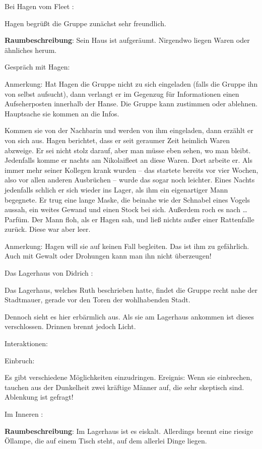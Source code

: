 Bei Hagen vom Fleet
:

Hagen begrüßt die Gruppe zunächst sehr freundlich.

\textbf{Raumbeschreibung}: Sein Haus ist aufgeräumt. Nirgendwo liegen Waren oder ähnliches herum.

Gespräch mit Hagen:

Anmerkung: Hat Hagen die Gruppe nicht zu sich eingeladen (falls die Gruppe ihn von selbst aufsucht), dann verlangt er im Gegenzug für Informationen einen Aufseherposten innerhalb der Hanse. Die Gruppe kann zustimmen oder ablehnen. Hauptsache sie kommen an die Infos.

Kommen sie von der Nachbarin und werden von ihm eingeladen, dann erzählt er von sich aus.
Hagen berichtet, dass er seit geraumer Zeit heimlich Waren abzweige. Er sei nicht stolz darauf, aber man müsse eben sehen, wo man bleibt. Jedenfalls komme er nachts am Nikolaifleet an diese Waren. Dort arbeite er. Als immer mehr seiner Kollegen krank wurden – das startete bereits vor vier Wochen, also vor allen anderen Ausbrüchen – wurde das sogar noch leichter. Eines Nachts jedenfalls schlich er sich wieder ins Lager, als ihm ein eigenartiger Mann begegnete. Er trug eine lange Maske, die beinahe wie der Schnabel eines Vogels aussah, ein weites Gewand und einen Stock bei sich. Außerdem roch es nach … Parfüm. Der Mann floh, als er Hagen sah, und ließ nichts außer einer Rattenfalle zurück. Diese war aber leer.

Anmerkung: Hagen will sie auf keinen Fall begleiten. Das ist ihm zu gefährlich. Auch mit Gewalt oder Drohungen kann man ihn nicht überzeugen!

Das Lagerhaus von Didrich
:

Das Lagerhaus, welches Ruth beschrieben hatte, findet die Gruppe recht nahe der Stadtmauer, gerade vor den Toren der wohlhabenden Stadt.

Dennoch sieht es hier erbärmlich aus. Als sie am Lagerhaus ankommen ist dieses verschlossen. Drinnen brennt jedoch Licht.

Interaktionen:

Einbruch:

Es gibt verschiedene Möglichkeiten einzudringen.
Ereignis: Wenn sie einbrechen, tauchen aus der Dunkelheit zwei kräftige Männer auf, die sehr skeptisch sind. Ablenkung ist gefragt!


Im Inneren
:

\textbf{Raumbeschreibung}: Im Lagerhaus ist es eiskalt. Allerdings brennt eine riesige Öllampe, die auf einem Tisch steht, auf dem allerlei Dinge liegen.

